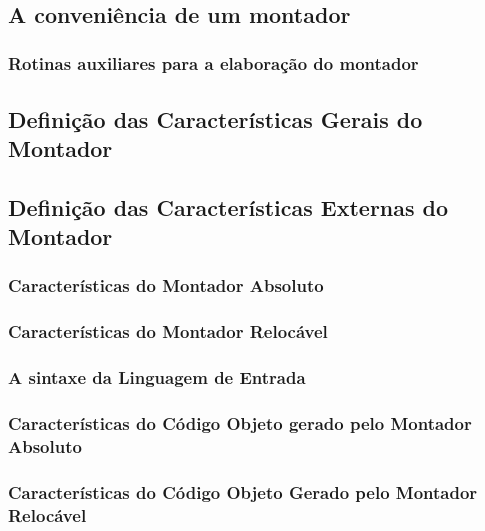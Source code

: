 \documentclass[a4paper,12pt]{article}
\begin{document}
\par
{}\\

\subsection{A conveniência de um montador}

\subsubsection{Rotinas auxiliares para a elaboração do montador}

\subsection{Definição das Características Gerais do Montador}

\subsection{Definição das Características Externas do Montador}

\subsubsection{Características do Montador Absoluto}
\subsubsection{Características do Montador Relocável}
\subsubsection{A sintaxe da Linguagem de Entrada}
\subsubsection{Características do Código Objeto gerado pelo Montador Absoluto}
\subsubsection{Características do Código Objeto Gerado pelo Montador Relocável}
\end{document}

